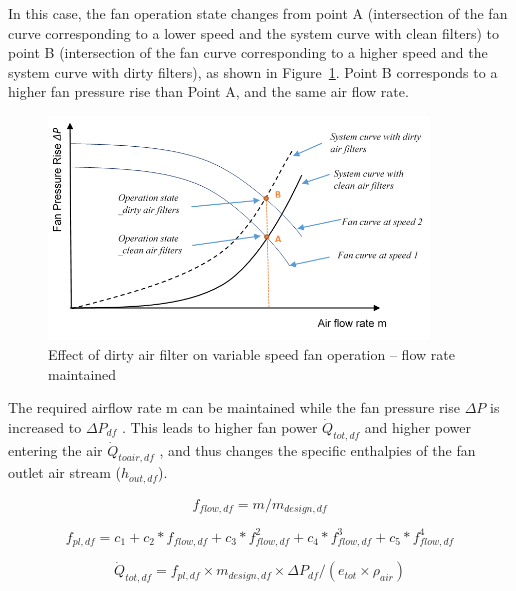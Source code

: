 In this case, the fan operation state changes from point A (intersection of the fan curve corresponding to a lower speed and the system curve with clean filters) to point B (intersection of the fan curve corresponding to a higher speed and the system curve with dirty filters), as shown in Figure~\ref{fig:effect-of-dirty-air-filter-on-variable-speed}. Point B corresponds to a higher fan pressure rise than Point A, and the same air flow rate.

\begin{figure}[hbtp] %
\centering
\includegraphics[width=0.9\textwidth, height=0.9\textheight, keepaspectratio=true]{media/image8006.png}
\caption{Effect of dirty air filter on variable speed fan operation – flow rate maintained \protect \label{fig:effect-of-dirty-air-filter-on-variable-speed}}
\end{figure}

The required airflow rate m can be maintained while the fan pressure rise \(\Delta P\) is increased to \(\Delta P_{df}\) . This leads to higher fan power \(\dot Q_{tot,df}\) and higher power entering the air \(\dot Q_{toair,df}\) , and thus changes the specific enthalpies of the fan outlet air stream (\(h_{out,df}\)).

\begin{equation}
f_{flow,df} = m / m_{design,df}
\end{equation}

\begin{equation}
f_{pl,df} = c_{1} + c_{2}*f_{flow,df} + c_{3}*f_{flow,df}^2 + c_{4}*f_{flow,df}^3 + c_{5}*f_{flow,df}^4
\end{equation}

\begin{equation}
\dot{Q}_{tot,df} = f_{pl,df} \times m_{design,df} \times \Delta P_{df} / (e_{tot} \times \rho_{air} )
\end{equation}

